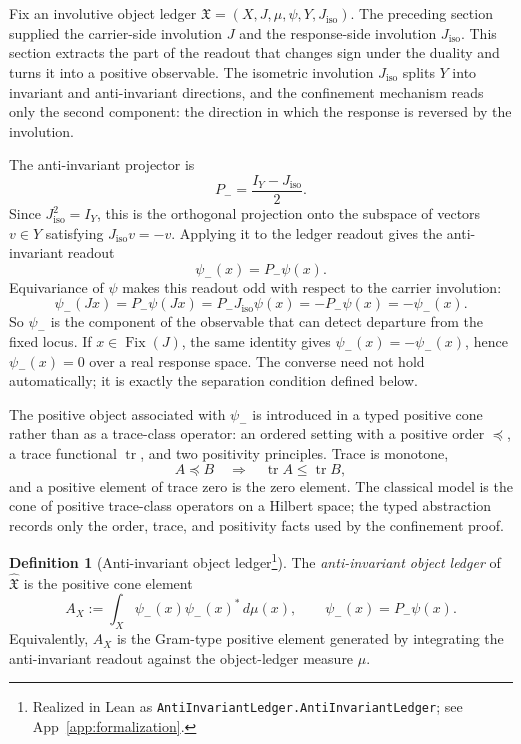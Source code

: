 \documentclass[11pt]{article}
\DeclareMathOperator{\Fix}{Fix}
\DeclareMathOperator{\trace}{tr}
\newcommand{\Pminus}{P_{-}}
\newcommand{\psim}{\psi_{-}}
\newcommand{\AX}{A_{X}}
\newcommand{\Jiso}{J_{\mathrm{iso}}}
\newcommand{\IOL}{\hat{\mathfrak{X}}}
\theoremstyle{definition}
\newtheorem{definition}[theorem]{Definition}
\begin{document}
Fix an involutive object ledger
\(\IOL=(X,J,\mu,\psi,Y,\Jiso)\).  The preceding section supplied
the carrier-side involution \(J\) and the response-side involution
\(\Jiso\).  This section extracts the part of the readout that
changes sign under the duality and turns it into a positive
observable.  The isometric involution \(\Jiso\) splits \(Y\) into
invariant and anti-invariant directions, and the confinement
mechanism reads only the second component: the direction in which
the response is reversed by the involution.

The anti-invariant projector is
\[
  \Pminus=\frac{I_Y-\Jiso}{2}.
\]
Since \(\Jiso^2=I_Y\), this is the orthogonal projection onto the
subspace of vectors \(v\in Y\) satisfying \(\Jiso v=-v\).  Applying
it to the ledger readout gives the anti-invariant readout
\[
  \psim(x)=\Pminus\psi(x).
\]
Equivariance of \(\psi\) makes this readout odd with respect to the
carrier involution:
\[
  \psim(Jx)
  =
  \Pminus\psi(Jx)
  =
  \Pminus\Jiso\psi(x)
  =
  -\Pminus\psi(x)
  =
  -\psim(x).
\]
So \(\psim\) is the component of the observable that can detect
departure from the fixed locus.  If \(x\in\Fix(J)\), the same
identity gives \(\psim(x)=-\psim(x)\), hence \(\psim(x)=0\) over a
real response space.  The converse need not hold automatically; it
is exactly the separation condition defined below.

The positive object associated with \(\psim\) is introduced in a
typed positive cone rather than as a trace-class operator: an
ordered setting with a positive order \(\preceq\), a trace
functional \(\trace\), and two positivity principles.  Trace is
monotone,
\[
  A\preceq B \quad\Longrightarrow\quad \trace A\leq \trace B,
\]
and a positive element of trace zero is the zero element.  The
classical model is the cone of positive trace-class operators on a
Hilbert space; the typed abstraction records only the order, trace,
and positivity facts used by the confinement proof.

\begin{definition}[Anti-invariant object ledger\protect\footnote{Realized in Lean as \nolinkurl{AntiInvariantLedger.AntiInvariantLedger}; see App~\ref{app:formalization}.}]
\label{def:duality_confinement:anti-invariant-ledger}
The \emph{anti-invariant object ledger} of \(\IOL\) is the positive
cone element
\[
  \AX
  :=
  \int_X \psim(x)\psim(x)^*\,d\mu(x),
  \qquad
  \psim(x)=\Pminus\psi(x).
\]
Equivalently, \(\AX\) is the Gram-type positive element generated
by integrating the anti-invariant readout against the object-ledger
measure \(\mu\).
\end{definition}
\end{document}
